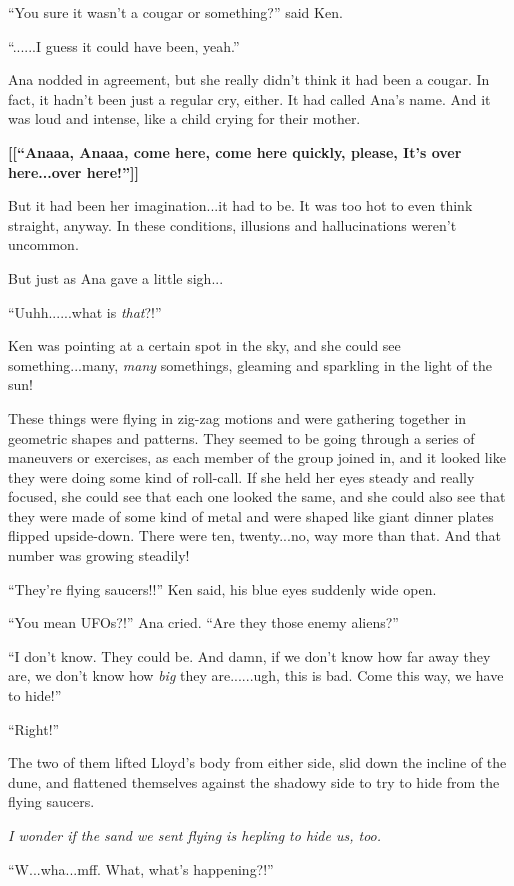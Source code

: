 \documentclass[
]{article}
\begin{document}
``You sure it wasn't a cougar or something?'' said Ken.

``......I guess it could have been, yeah.''

Ana nodded in agreement, but she really didn't think it had been a
cougar. In fact, it hadn't been just a regular cry, either. It had
called Ana's name. And it was loud and intense, like a child crying for
their mother.

\textbf{{[}{[}``Anaaa, Anaaa, come here, come here quickly, please, It's
over here...over here!''{]}{]}}

But it had been her imagination...it had to be. It was too hot to even
think straight, anyway. In these conditions, illusions and
hallucinations weren't uncommon.

But just as Ana gave a little sigh...

``Uuhh......what is \emph{that}?!''

Ken was pointing at a certain spot in the sky, and she could see
something...many, \emph{many} somethings, gleaming and sparkling in the
light of the sun!

These things were flying in zig-zag motions and were gathering together
in geometric shapes and patterns. They seemed to be going through a
series of maneuvers or exercises, as each member of the group joined in,
and it looked like they were doing some kind of roll-call. If she held
her eyes steady and really focused, she could see that each one looked
the same, and she could also see that they were made of some kind of
metal and were shaped like giant dinner plates flipped upside-down.
There were ten, twenty...no, way more than that. And that number was
growing steadily!

``They're flying saucers!!'' Ken said, his blue eyes suddenly wide open.

``You mean UFOs?!'' Ana cried. ``Are they those enemy aliens?''

``I don't know. They could be. And damn, if we don't know how far away
they are, we don't know how \emph{big} they are......ugh, this is bad.
Come this way, we have to hide!''

``Right!''

The two of them lifted Lloyd's body from either side, slid down the
incline of the dune, and flattened themselves against the shadowy side
to try to hide from the flying saucers.

\emph{I wonder if the sand we sent flying is hepling to hide us, too.}

``W...wha...mff. What, what's happening?!''
\end{document}
